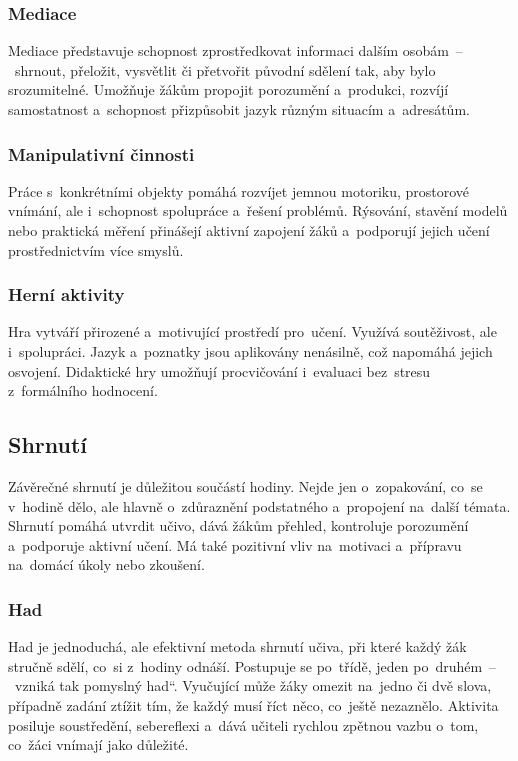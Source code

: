 \documentclass[male,czech,api_bc]{kitheses}
\begin{document}
\subsubsection{Mediace}

Mediace představuje schopnost zprostředkovat informaci dalším osobám~--~shrnout, přeložit, vysvětlit či přetvořit původní sdělení tak, aby bylo srozumitelné. Umožňuje žákům propojit porozumění a~produkci, rozvíjí samostatnost a~schopnost přizpůsobit jazyk různým situacím a~adresátům.

\subsubsection{Manipulativní činnosti}

Práce s~konkrétními objekty pomáhá rozvíjet jemnou motoriku, prostorové vnímání, ale i~schopnost spolupráce a~řešení problémů. Rýsování, stavění modelů nebo praktická měření přinášejí aktivní zapojení žáků a~podporují jejich učení prostřednictvím více smyslů.

\subsubsection{Herní aktivity}

Hra vytváří přirozené a~motivující prostředí pro~učení. Využívá soutěživost, ale i~spolupráci. Jazyk a~poznatky jsou aplikovány nenásilně, což napomáhá jejich osvojení. Didaktické hry umožňují procvičování i~evaluaci bez~stresu z~formálního hodnocení.

\subsection{Shrnutí}

Závěrečné shrnutí je důležitou součástí hodiny. Nejde jen o~zopakování, co~se v~hodině dělo, ale hlavně o~zdůraznění podstatného a~propojení na~další témata. Shrnutí pomáhá utvrdit učivo, dává žákům přehled, kontroluje porozumění a~podporuje aktivní učení. Má také pozitivní vliv na~motivaci a~přípravu na~domácí úkoly nebo zkoušení.

\subsubsection{Had}

Had je jednoduchá, ale efektivní metoda shrnutí učiva, při které každý žák stručně sdělí, co~si z~hodiny odnáší. Postupuje se po~třídě, jeden po~druhém~--~vzniká tak pomyslný \quotedblbase had``. Vyučující může žáky omezit na~jedno či dvě slova, případně zadání ztížit tím, že každý musí říct něco, co~ještě nezaznělo. Aktivita posiluje soustředění, sebereflexi a~dává učiteli rychlou zpětnou vazbu o~tom, co~žáci vnímají jako důležité.
\end{document}
